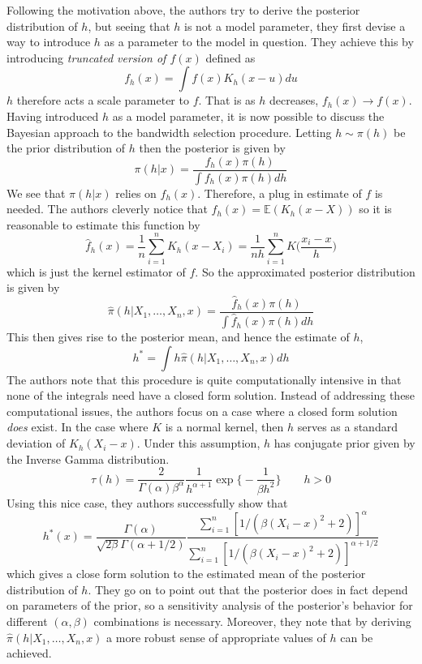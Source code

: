 \documentclass[12pt]{article}  %
\begin{document}
Following the motivation above, the authors try to derive the posterior distribution of $h$, but seeing that $h$ is not a model parameter, they first devise a way to introduce $h$ as a parameter to the model in question. They achieve this by introducing \textit{truncated version of $f(x)$} defined as $$f_h(x) = \int f(x)K_h(x-u)du$$ $h$ therefore acts a scale parameter to $f$. That is as $h$ decreases, $f_h(x)\to f(x)$. Having introduced $h$ as a model parameter, it is now possible to discuss the Bayesian approach to the bandwidth selection procedure. Letting $h\sim\pi(h)$ be the prior distribution of $h$ then the posterior is given by $$\pi(h|x)= \frac{f_h(x)\pi(h)}{\int f_h(x)\pi(h)dh}$$
We see that $\pi(h|x)$ relies on $f_h(x)$. Therefore, a plug in estimate of $f$ is needed. The authors cleverly notice that $f_h(x) = \mathbb{E}(K_h(x-X))$ so it is reasonable to estimate this function by $$\widehat{f}_h(x) = \frac{1}{n}\sum_{i=1}^{n}K_h(x - X_i) = \frac{1}{nh}\sum_{i=1}^{n}K\Big(\frac{x_i-x}{h}\Big)$$ which is just the kernel estimator of $f$. So the approximated posterior distribution is given by $$\hat{\pi}(h|X_1, \ldots, X_n, x) = \frac{\widehat{f}_h(x)\pi(h)}{\int \widehat{f}_h(x)\pi(h)dh}$$
This then gives rise to the posterior mean, and hence the estimate of $h$, $$h^{*} = \int h\hat{\pi}(h|X_1, \ldots, X_n, x)dh$$ The authors note that this procedure is quite computationally intensive in that none of the integrals need have a closed form solution. Instead of addressing these computational issues, the authors focus on a case where a closed form solution \textit{does} exist. In the case where $K$ is a normal kernel, then $h$ serves as a standard deviation of $K_h(X_i-x)$. Under this assumption, $h$ has conjugate prior given by the Inverse Gamma distribution. $$\tau(h) = \frac{2}{\Gamma(\alpha)\beta^{\alpha}}\frac{1}{h^{\alpha + 1}}\exp\big\{-\frac{1}{\beta h^2}\big\}\hspace{2em} h>0$$ Using this nice case, they authors successfully show that $$h^{*}(x) = \frac{\Gamma(\alpha)}{\sqrt{2\beta}\Gamma(\alpha + 1/2)}\frac{\sum_{i=1}^{n}[1/(\beta(X_i - x)^2 + 2)]^{\alpha}}{\sum_{i=1}^{n}[1/(\beta(X_i - x)^2 + 2)]^{\alpha + 1/2}}$$ which gives a close form solution to the estimated mean of the posterior distribution of $h$. They go on to point out that the posterior does in fact depend on parameters of the prior, so a sensitivity analysis of the posterior's behavior for different $(\alpha, \beta)$ combinations is necessary. Moreover, they note that by deriving $\hat{\pi}(h|X_1, \ldots, X_n, x)$ a more robust sense of appropriate values of $h$ can be achieved. 
\end{document}
